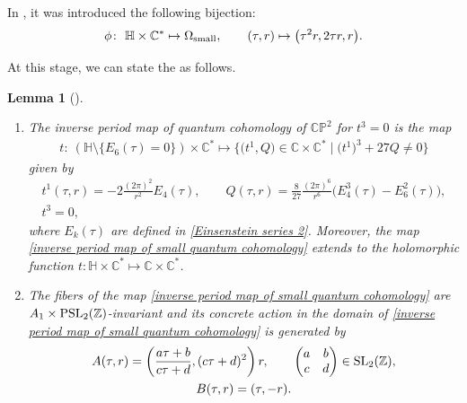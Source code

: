 \documentclass[pdftex]{sigma}
\numberwithin{equation}{section}
\newtheorem{Lemma}[Theorem]{Lemma}
\begin{document}
In \cite[Section 2.3]{Milanov}, it was introduced the following bijection:
\[%
\phi\colon\ \mathbb{H}\times \mathbb{C}^{*} \mapsto \Omega_{\rm small},\qquad
(\tau,r) \mapsto \bigl(\tau^2r,2\tau r, r\bigr).
\]

At this stage, we can state the \cite[Theorem 2.3]{Milanov} as follows.

\begin{Lemma}[{\cite{Milanov}}]\label{Lemma Milanov affine small quantum cohomology}\quad
\begin{enumerate}\itemsep=0pt
\item[$(1)$]
The inverse period map of quantum cohomology of $\mathbb{CP}^2$ for $t^3=0$ is the map
\begin{gather*}
t\colon\ (\mathbb{H}\setminus\{E_6(\tau)=0 \})\times \mathbb{C}^{*} \mapsto \bigl\{ \bigl(t^1,Q\bigr) \in \mathbb{C}\times \mathbb{C}^{*} \mid \bigl(t^1\bigr)^3+27Q\neq 0\bigr\}
\end{gather*}
given by
\begin{gather}
t^1(\tau,r)=-2\frac{ (2\pi )^2}{r^2} E_4(\tau) ,\qquad
Q(\tau,r)=\frac{8}{27}\frac{(2\pi)^6 }{r^6} \bigl(E_4^3(\tau)-E_6^2(\tau) \bigr) ,\nonumber\\
t^3=0,\label{inverse period map of small quantum cohomology}
\end{gather}
where $E_k(\tau)$ are defined in \eqref{Einsenstein series 2}. Moreover, the map \eqref{inverse period map of small quantum cohomology} extends to the holomorphic function
$
t\colon \mathbb{H}\times \mathbb{C}^{*} \mapsto \mathbb{C}\times \mathbb{C}^{*}$.
\item[$(2)$]
The fibers of the map \eqref{inverse period map of small quantum cohomology} are $A_1\times {\rm PSL}_2(\mathbb{Z})$-invariant and its concrete action in the domain of \eqref{inverse period map of small quantum cohomology} is generated by
\begin{gather}
A(\tau,r)=\left( \frac{a\tau+b}{c\tau+d} , (c\tau+d)^2\right)r,\qquad {\begin{pmatrix}
a& b \\
c& d \\
\end{pmatrix}} \in {\rm SL}_2(\mathbb{Z}),\nonumber\\
B(\tau,r)=( \tau , -r).\label{Monodromy action affine small quantum cohomology}
\end{gather}
\end{enumerate}
\end{Lemma}
\end{document}
